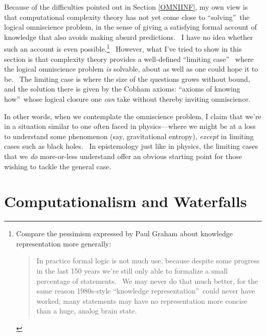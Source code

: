 \documentclass[12pt,onecolumn]{article}%
\begin{document}
Because of the difficulties pointed out in Section \ref{OMNIINF}, my own view
is that computational complexity theory has not yet come close to
\textquotedblleft solving\textquotedblright\ the logical omniscience problem,
in the sense of giving a satisfying formal account of knowledge that also
avoids making absurd predictions. \ I have no idea whether such an account is
even possible.\footnote{Compare the pessimism expressed by Paul Graham
\cite{graham} about knowledge representation more generally:
\par
\begin{quotation}
\noindent In practice formal logic is not much use, because despite some
progress in the last 150 years we're still only able to formalize a small
percentage of statements. \ We may never do that much better, for the same
reason 1980s-style \textquotedblleft knowledge
representation\textquotedblright\ could never have worked; many statements may
have no representation more concise than a huge, analog brain state.
\end{quotation}
} \ However, what I've tried to show in this section is that complexity theory
provides a well-defined \textquotedblleft limiting case\textquotedblright%
\ where the logical omniscience problem \textit{is} solvable, about as well as
one could hope it to be. \ The limiting case is where the size of the
questions grows without bound, and the solution there is given by the Cobham
axioms: \textquotedblleft axioms of knowing how\textquotedblright\ whose
logical closure one \textit{can} take without thereby inviting omniscience.

In other words, when we contemplate the omniscience problem, I claim that
we're in a situation similar to one often faced in physics---where we might be
at a loss to understand some phenomenon (say, gravitational entropy),
\textit{except} in limiting cases such as black holes. \ In epistemology just
like in physics, the limiting cases that we \textit{do} more-or-less
understand offer an obvious starting point for those wishing to tackle the
general case.

\section{Computationalism and Waterfalls\label{WATERFALLS}}
\end{document}
